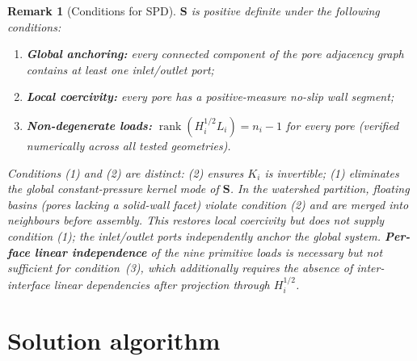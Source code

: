 \documentclass[11pt,a4paper]{article}
\newtheorem{remark}{Remark}
\newcommand{\Schur}{\mathbf{S}}
\begin{document}
\begin{remark}[Conditions for SPD]\label{rem:spd}
  $\Schur$ is positive definite under the following conditions:
  \begin{enumerate}[nosep,leftmargin=*]
    \item \textbf{Global anchoring:} every connected component of the pore
      adjacency graph contains at least one inlet/outlet port;
    \item \textbf{Local coercivity:} every pore has a positive-measure
      no-slip wall segment;
    \item \textbf{Non-degenerate loads:}
      $\operatorname{rank}(H_i^{1/2}L_i) = n_i - 1$ for every pore
      (verified numerically across all tested geometries).
  \end{enumerate}
  Conditions (1) and (2) are distinct: (2) ensures $K_i$ is invertible;
  (1) eliminates the global constant-pressure kernel mode of $\Schur$.
  In the watershed partition, \emph{floating basins} (pores lacking a
  solid-wall facet) violate condition (2) and are merged into neighbours
  before assembly.  This restores local coercivity but does not supply
  condition (1); the inlet/outlet ports independently anchor the global
  system.
  \textbf{Per-face linear independence} of the nine primitive loads is
  necessary but not sufficient for condition~(3), which additionally
  requires the absence of inter-interface linear dependencies after
  projection through $H_i^{1/2}$.
\end{remark}

\section{Solution algorithm}
\label{sec:algorithm}
\end{document}
